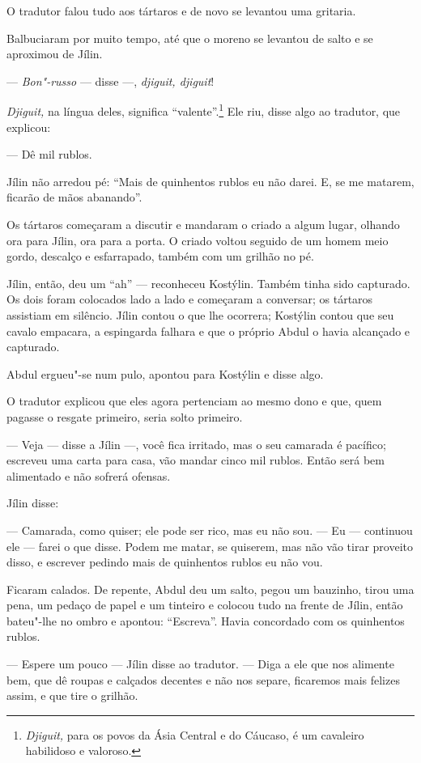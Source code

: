 O tradutor falou tudo aos tártaros e de novo se levantou uma gritaria.

Balbuciaram por muito tempo, até que o moreno se levantou de salto e se
aproximou de Jílin.

--- \emph{Bon"-russo} --- disse ---, \emph{djiguit, djiguit}!

\emph{Djiguit,} na língua deles, significa ``valente''.\footnote{\emph{Djiguit,}
  para os povos da Ásia Central e do Cáucaso, é um cavaleiro habilidoso
  e valoroso.} Ele riu, disse algo ao tradutor, que explicou:

--- Dê mil rublos.

Jílin não arredou pé: ``Mais de quinhentos rublos eu não darei. E, se me
matarem, ficarão de mãos abanando''.

Os tártaros começaram a discutir e mandaram o criado a algum lugar,
olhando ora para Jílin, ora para a porta. O criado voltou seguido de um
homem meio gordo, descalço e esfarrapado, também com um grilhão no pé.

Jílin, então, deu um ``ah'' --- reconheceu Kostýlin. Também tinha sido
capturado. Os dois foram colocados lado a lado e começaram a conversar;
os tártaros assistiam em silêncio. Jílin contou o que lhe ocorrera;
Kostýlin contou que seu cavalo empacara, a espingarda falhara e que o
próprio Abdul o havia alcançado e capturado.

Abdul ergueu"-se num pulo, apontou para Kostýlin e disse algo.

O tradutor explicou que eles agora pertenciam ao mesmo dono e que, quem
pagasse o resgate primeiro, seria solto primeiro.

--- Veja --- disse a Jílin ---, você fica irritado, mas o seu camarada é
pacífico; escreveu uma carta para casa, vão mandar cinco mil rublos.
Então será bem alimentado e não sofrerá ofensas.

Jílin disse:

--- Camarada, como quiser; ele pode ser rico, mas eu não sou. --- Eu ---
continuou ele --- farei o que disse. Podem me matar, se quiserem, mas
não vão tirar proveito disso, e escrever pedindo mais de quinhentos
rublos eu não vou.

Ficaram calados. De repente, Abdul deu um salto, pegou um bauzinho,
tirou uma pena, um pedaço de papel e um tinteiro e colocou tudo na
frente de Jílin, então bateu"-lhe no ombro e apontou: ``Escreva''. Havia
concordado com os quinhentos rublos.

--- Espere um pouco --- Jílin disse ao tradutor. --- Diga a ele que nos
alimente bem, que dê roupas e calçados decentes e não nos separe,
ficaremos mais felizes assim, e que tire o grilhão.

